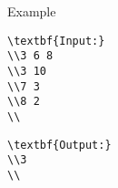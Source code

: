 Example
\begin{verbatim}
\textbf{Input:}
\\3 6 8
\\3 10
\\7 3
\\8 2
\\\end{verbatim}
\begin{itemize}
\end{itemize}
\begin{verbatim}
\textbf{Output:}
\\3
\\\end{verbatim}